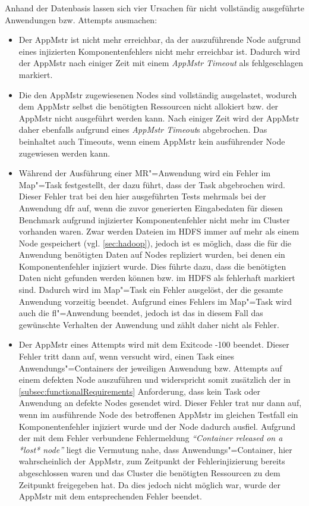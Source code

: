 Anhand der Datenbasis lassen sich vier Ursachen für nicht vollständig ausgeführte Anwendungen bzw. Attempts ausmachen:

\begin{itemize}
    \item
        Der \gls{AppMstr} ist nicht mehr erreichbar, da der auszuführende Node aufgrund eines injizierten Komponentenfehlers nicht mehr erreichbar ist.
        Dadurch wird der \gls{AppMstr} nach einiger Zeit mit einem \emph{\gls{AppMstr} Timeout} als fehlgeschlagen markiert.
    \item
        Die den \gls{AppMstr} zugewiesenen Nodes sind vollständig ausgelastet, wodurch dem \gls{AppMstr} selbst die benötigten Ressourcen nicht allokiert bzw. der \gls{AppMstr} nicht ausgeführt werden kann.
        Nach einiger Zeit wird der \gls{AppMstr} daher ebenfalls aufgrund eines \emph{\gls{AppMstr} Timeout}s abgebrochen.
        Das beinhaltet auch Timeouts, wenn einem \gls{AppMstr} kein ausführender Node zugewiesen werden kann.
    \item
        Während der Ausführung einer \gls{MR}"=Anwendung wird ein Fehler im Map"=Task festgestellt, der dazu führt, dass der Task abgebrochen wird.
        Dieser Fehler trat bei den hier ausgeführten Tests mehrmals bei der Anwendung \acrlong{dfr} auf, wenn die zuvor generierten Eingabedaten für diesen Benchmark aufgrund injizierter Komponentenfehler nicht mehr im Cluster vorhanden waren.
        Zwar werden Dateien im HDFS immer auf mehr als einem Node gespeichert (vgl. \cref{sec:hadoop}), jedoch ist es möglich, dass die für die Anwendung benötigten Daten auf Nodes repliziert wurden, bei denen ein Komponentenfehler injiziert wurde.
        Dies führte dazu, dass die benötigten Daten nicht gefunden werden können bzw. im HDFS als fehlerhaft markiert sind.
        Dadurch wird im Map"=Task ein Fehler ausgelöst, der die gesamte Anwendung vorzeitig beendet.
        Aufgrund eines Fehlers im Map"=Task wird auch die \acrlong{fl}"=Anwendung beendet, jedoch ist das in diesem Fall das gewünschte Verhalten der Anwendung und zählt daher nicht als Fehler.
    \item
        Der \gls{AppMstr} eines Attempts wird mit dem Exitcode -100 beendet.
        Dieser Fehler tritt dann auf, wenn versucht wird, einen Task eines Anwendungs"=Containers der jeweiligen Anwendung bzw. Attempts auf einem defekten Node auszuführen und widerspricht somit zusätzlich der in \cref{subsec:functionalRequirements} Anforderung, dass kein Task oder Anwendung an defekte Nodes gesendet wird.
        Dieser Fehler trat nur dann auf, wenn im ausführende Node des betroffenen \gls{AppMstr} im gleichen Testfall ein Komponentenfehler injiziert wurde und der Node dadurch ausfiel.
        Aufgrund der mit dem Fehler verbundene Fehlermeldung \emph{\enquote{Container released on a *lost* node}} liegt die Vermutung nahe, dass Anwendungs"=Container, hier wahrscheinlich der \gls{AppMstr}, zum Zeitpunkt der Fehlerinjizierung bereits abgeschlossen waren und das Cluster die benötigten Ressourcen zu dem Zeitpunkt freigegeben hat.
        Da dies jedoch nicht möglich war, wurde der \gls{AppMstr} mit dem entsprechenden Fehler beendet.
\end{itemize}

